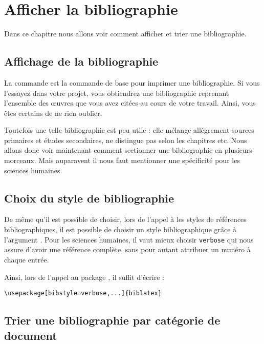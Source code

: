 \chapter{Afficher la bibliographie}

\begin{prealable}

Dans ce chapitre nous allons voir comment afficher et trier une bibliographie.
\end{prealable}


\section{Affichage de la bibliographie}

La commande  est la commande de base pour imprimer une bibliographie. Si vous l'essayez dans votre projet, vous obtiendrez une bibliographie reprenant l'ensemble des œuvres que vous avez citées au cours de votre travail. Ainsi, vous êtes certains de ne rien oublier.

Toutefois une telle bibliographie est peu utile : elle mélange allègrement sources primaires et études secondaires, ne distingue pas selon les chapitres etc. Nous allons donc voir maintenant comment sectionner une bibliographie en plusieurs morceaux. Mais auparavent il nous faut mentionner une spécificité pour les sciences humaines.

\section{Choix du style de bibliographie}

De même qu'il est possible de choisir, lors de l'appel à  les styles de références bibliographiques, il est possible de choisir un style bibliographique grâce à l'argument . Pour les sciences humaines, il vaut mieux choisir \verb|verbose| qui nous assure d'avoir une référence complète, sans pour autant attribuer un numéro à chaque entrée.

Ainsi, lors de l'appel au package , il suffit d'écrire :

\begin{verbatim}
\usepackage[bibstyle=verbose,...]{biblatex}

\end{verbatim}

\section{Trier une bibliographie par catégorie de document}


